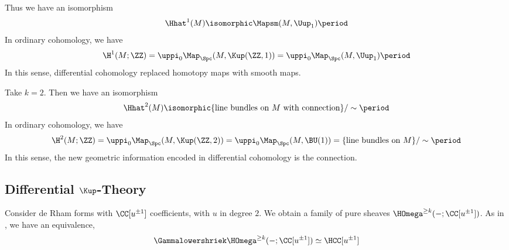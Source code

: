 \begin{example}
	Thus we have an isomorphism
	\begin{equation*}
		\Hhat^1(M)\isomorphic\Mapsm(M,\Uup_{1}) \period
	\end{equation*}
	In ordinary cohomology, we have
	\begin{equation*}
		\H^1(M;\ZZ)= \uppi_{0} \Map_{\Spc}(M,\Kup(\ZZ,1)) = \uppi_{0} \Map_{\Spc}(M,\Uup_{1}) \period
	\end{equation*}
	In this sense, differential cohomology replaced homotopy maps with smooth maps.
\end{example}

\begin{example}
	Take $k=2$. 
	Then we have an isomorphism
	\begin{equation*}
		\Hhat^2(M) \isomorphic \{\text{line bundles on $M$ with connection}\}/\sim \period
	\end{equation*}
	In ordinary cohomology, we have
	\begin{equation*}
		\H^2(M;\ZZ) = \uppi_{0} \Map_{\Spc}(M,\Kup(\ZZ,2)) = \uppi_{0} \Map_{\Spc}(M,\BU(1)) = \{\text{line bundles on $M$}\}/\sim \period 
	\end{equation*}
	In this sense, the new geometric information encoded in differential cohomology is the connection.
\end{example}


\subsection{Differential \texorpdfstring{$\Kup$}{K}-Theory}\label{subsec:diffKtheory}

\begin{nul}
	Consider de Rham forms with $\CC[u^{\pm 1}]$ coefficients, with $u$ in degree $2$. 
	We obtain a family of pure sheaves $\HOmega^{\geq k}(-;\CC[u^{\pm 1}])$. 
	As in , we have an equivalence,
	\begin{equation*}
		\Gammalowershriek\HOmega^{\geq k}(-;\CC[u^{\pm 1}])\simeq \HCC[u^{\pm 1}]
	\end{equation*}
\end{nul}

